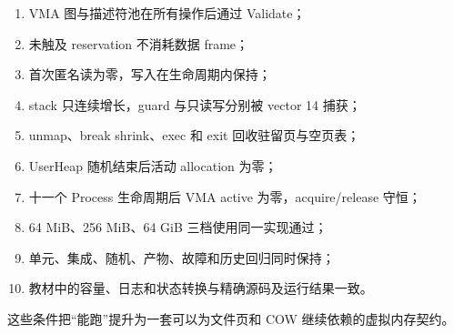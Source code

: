 \begin{enumerate}
  \item VMA 图与描述符池在所有操作后通过 Validate；
  \item 未触及 reservation 不消耗数据 frame；
  \item 首次匿名读为零，写入在生命周期内保持；
  \item stack 只连续增长，guard 与只读写分别被 vector 14 捕获；
  \item unmap、break shrink、exec 和 exit 回收驻留页与空页表；
  \item UserHeap 随机结束后活动 allocation 为零；
  \item 十一个 Process 生命周期后 VMA active 为零，acquire/release 守恒；
  \item 64 MiB、256 MiB、64 GiB 三档使用同一实现通过；
  \item 单元、集成、随机、产物、故障和历史回归同时保持；
  \item 教材中的容量、日志和状态转换与精确源码及运行结果一致。
\end{enumerate}

这些条件把“能跑”提升为一套可以为文件页和 COW 继续依赖的虚拟内存契约。
